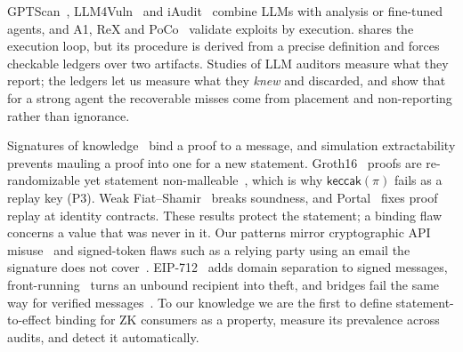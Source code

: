 GPTScan~\cite{gptscan}, LLM4Vuln~\cite{llm4vuln} and iAudit~\cite{iaudit}
combine LLMs with analysis or fine-tuned agents, and A1, ReX and
PoCo~\cite{a1-agent,rex,poco} validate exploits by execution. \tool{} shares
the execution loop, but its procedure is derived from a precise definition
and forces checkable ledgers over two artifacts. Studies of LLM auditors
measure what they report; the ledgers let us measure what they \emph{knew}
and discarded, and show that for a strong agent the recoverable misses come
from placement and non-reporting rather than ignorance.

Signatures of knowledge~\cite{sig-of-knowledge,snarky-sigs} bind a proof to a
message, and simulation extractability prevents mauling a proof into one for
a new statement. Groth16~\cite{groth16} proofs are re-randomizable yet
statement non-malleable~\cite{groth16-randomization}, which is why
$\mathsf{keccak}(\pi)$ fails as a replay key (P3). Weak
Fiat--Shamir~\cite{weak-fs} breaks soundness, and Portal~\cite{portal} fixes
proof replay at identity contracts. These results protect the statement; a
binding flaw concerns a value that was never in it. Our patterns mirror
cryptographic API misuse~\cite{egele-crypto-misuse,cryptoguard,crysl,cognicrypt}
and signed-token flaws such as a relying party using an email the signature
does not cover~\cite{sso-flaws}. EIP-712~\cite{eip712} adds domain separation
to signed messages, front-running~\cite{flashboys} turns an unbound recipient
into theft, and bridges fail the same way for verified
messages~\cite{bridge-sok,xscope,smartaxe,interop-sok}. To our knowledge we
are the first to define statement-to-effect binding for ZK consumers as a
property, measure its prevalence across audits, and detect it
automatically.
